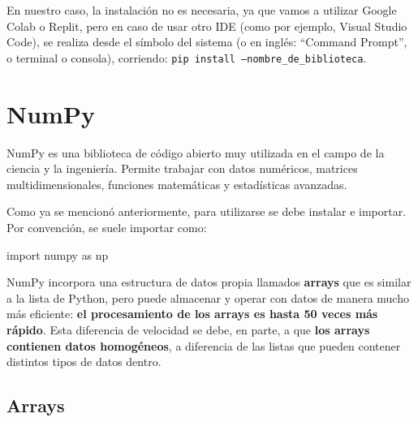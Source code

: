 \documentclass[
  letterpaper,
  DIV=11,
  numbers=noendperiod]{scrreprt}
\newenvironment{Shaded}{\begin{snugshade}}{\end{snugshade}}
\newcommand{\ImportTok}[1]{\textcolor[rgb]{0.00,0.46,0.62}{#1}}
\newcommand{\NormalTok}[1]{\textcolor[rgb]{0.00,0.23,0.31}{#1}}
\begin{document}
\begin{tcolorbox}[enhanced jigsaw, opacitybacktitle=0.6, toptitle=1mm, toprule=.15mm, arc=.35mm, breakable, bottomrule=.15mm, opacityback=0, leftrule=.75mm, rightrule=.15mm, title=\textcolor{quarto-callout-note-color}{\faInfo}\hspace{0.5em}{Note}, left=2mm, bottomtitle=1mm, colframe=quarto-callout-note-color-frame, colback=white, titlerule=0mm, coltitle=black, colbacktitle=quarto-callout-note-color!10!white]

En nuestro caso, la instalación no es necesaria, ya que vamos a utilizar
Google Colab o Replit, pero en caso de usar otro IDE (como por ejemplo,
Visual Studio Code), se realiza desde el símbolo del sistema (o en
inglés: ``Command Prompt'', o terminal o consola), corriendo:
\texttt{pip\ install\ –nombre\_de\_biblioteca}.

\end{tcolorbox}

\section{NumPy}\label{numpy}

NumPy es una biblioteca de código abierto muy utilizada en el campo de
la ciencia y la ingeniería. Permite trabajar con datos numéricos,
matrices multidimensionales, funciones matemáticas y estadísticas
avanzadas.

Como ya se mencionó anteriormente, para utilizarse se debe instalar e
importar. Por convención, se suele importar como:

\begin{Shaded}
\begin{Highlighting}[]
\ImportTok{import}\NormalTok{ numpy }\ImportTok{as}\NormalTok{ np}
\end{Highlighting}
\end{Shaded}

NumPy incorpora una estructura de datos propia llamados \textbf{arrays}
que es similar a la lista de Python, pero puede almacenar y operar con
datos de manera mucho más eficiente: \textbf{el procesamiento de los
arrays es hasta 50 veces más rápido}. Esta diferencia de velocidad se
debe, en parte, a que \textbf{los arrays contienen datos homogéneos}, a
diferencia de las listas que pueden contener distintos tipos de datos
dentro.

\subsection{\texorpdfstring{\textbf{Arrays}}{Arrays}}\label{arrays}
\end{document}
